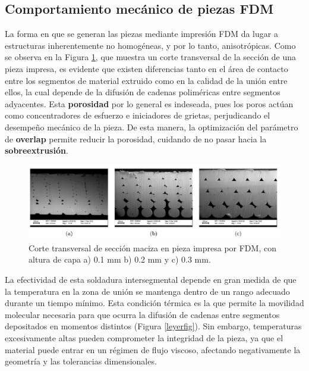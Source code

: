 \subsection{Comportamiento mecánico de piezas FDM}

La forma en que se generan las piezas mediante impresión FDM da lugar a estructuras inherentemente no homogéneas, y por lo tanto, anisotrópicas. Como se observa en la Figura \ref{porofig}, que muestra un corte transversal de la sección  de una pieza impresa, es evidente que existen diferencias tanto en el área de contacto entre los segmentos de material extruido como en la calidad de la unión entre ellos, la cual depende de la difusión de cadenas poliméricas entre segmentos adyacentes. Esta \textbf{porosidad} por lo general es indeseada, pues los poros actúan como concentradores de esfuerzo e iniciadores de grietas, perjudicando el desempeño mecánico de la pieza. De esta manera, la optimización del parámetro de \textbf{overlap} permite reducir la porosidad, cuidando de no pasar hacia la \textbf{sobreextrusión}.

\begin{figure}[h!]
	\centering
	\includegraphics[width=1.0\linewidth]{imgs/poro.png}
	\caption{Corte transversal de sección maciza en pieza impresa por FDM, con altura de capa a) 0.1 mm b) 0.2 mm y c) 0.3 mm. \cite{porob}}
	\label{porofig}
\end{figure} 

La efectividad de esta soldadura intersegmental depende en gran medida de que la temperatura en la zona de unión se mantenga dentro de un rango adecuado durante un tiempo mínimo. Esta condición térmica es la que permite la movilidad molecular necesaria para que ocurra la difusión de cadenas entre segmentos depositados en momentos distintos (Figura \ref{leyerfig}). Sin embargo, temperaturas excesivamente altas pueden comprometer la integridad de la pieza, ya que el material puede entrar en un régimen de flujo viscoso, afectando negativamente la geometría y las tolerancias dimensionales. 

